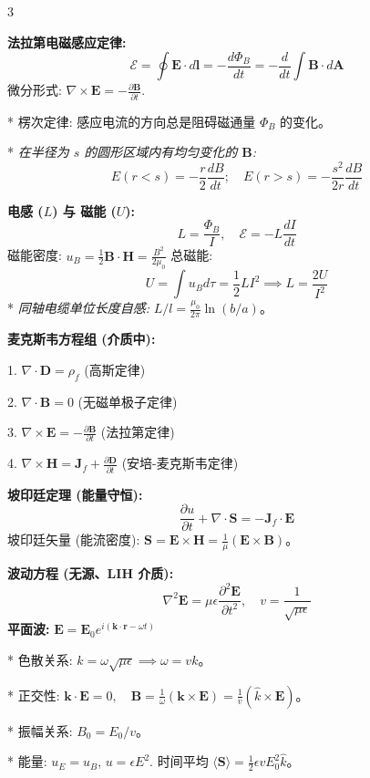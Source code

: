 \documentclass[10pt,a4paper,landscape,utf8]{ctexart}
\newcommand{\p}{\partial}
\newcommand{\bs}[1]{\boldsymbol{#1}}
\begin{document}
\begin{multicols*}{3}

\textbf{法拉第电磁感应定律:}
$$ \mathcal{E} = \oint \bs{E} \cdot d\bs{l} = -\frac{d\Phi_B}{dt} = -\frac{d}{dt} \int \bs{B} \cdot d\bs{A} $$
微分形式: $\nabla \times \bs{E} = -\frac{\p\bs{B}}{\p t}$.

* 楞次定律: 感应电流的方向总是阻碍磁通量 $\Phi_B$ 的变化。

* \textit{在半径为 $s$ 的圆形区域内有均匀变化的 $\bs{B}$:}
$$E(r<s) = -\frac{r}{2}\frac{dB}{dt}; \quad E(r>s) = -\frac{s^2}{2r}\frac{dB}{dt}$$

\textbf{电感 ($L$) 与 磁能 ($U$):}
$$ L = \frac{\Phi_B}{I}, \quad \mathcal{E} = -L\frac{dI}{dt} $$
磁能密度: $u_B = \frac{1}{2}\bs{B}\cdot\bs{H} = \frac{B^2}{2\mu_0}$
总磁能:
$$ U = \int u_B d\tau = \frac{1}{2}LI^2 \implies L = \frac{2U}{I^2} $$
* \textit{同轴电缆单位长度自感:} $L/l = \frac{\mu_0}{2\pi}\ln(b/a)$。


\textbf{麦克斯韦方程组 (介质中):}

1. $\nabla \cdot \bs{D} = \rho_f$ (高斯定律)

2. $\nabla \cdot \bs{B} = 0$ (无磁单极子定律)

3. $\nabla \times \bs{E} = -\frac{\p\bs{B}}{\p t}$ (法拉第定律)

4. $\nabla \times \bs{H} = \bs{J}_f + \frac{\p\bs{D}}{\p t}$ (安培-麦克斯韦定律)

\textbf{坡印廷定理 (能量守恒):}
$$ \frac{\p u}{\p t} + \nabla \cdot \bs{S} = -\bs{J}_f \cdot \bs{E} $$
坡印廷矢量 (能流密度): $\bs{S} = \bs{E} \times \bs{H} = \frac{1}{\mu}(\bs{E} \times \bs{B})$。


\textbf{波动方程 (无源、LIH 介质):}
$$ \nabla^2\bs{E} = \mu\epsilon\frac{\p^2\bs{E}}{\p t^2}, \quad v = \frac{1}{\sqrt{\mu\epsilon}} $$
\textbf{平面波:} $\bs{E} = \bs{E}_0 e^{i(\bs{k}\cdot\bs{r} - \omega t)}$

* 色散关系: $k = \omega\sqrt{\mu\epsilon} \implies \omega = vk$。

* 正交性: $\bs{k} \cdot \bs{E} = 0, \quad \bs{B} = \frac{1}{\omega}(\bs{k} \times \bs{E}) = \frac{1}{v}(\hat{k} \times \bs{E})$。

* 振幅关系: $B_0 = E_0 / v$。

* 能量: $u_E = u_B$, $u = \epsilon E^2$. 时间平均 $\langle\bs{S}\rangle = \frac{1}{2}\epsilon v E_0^2 \hat{k}$。


\end{multicols*}
\end{document}
